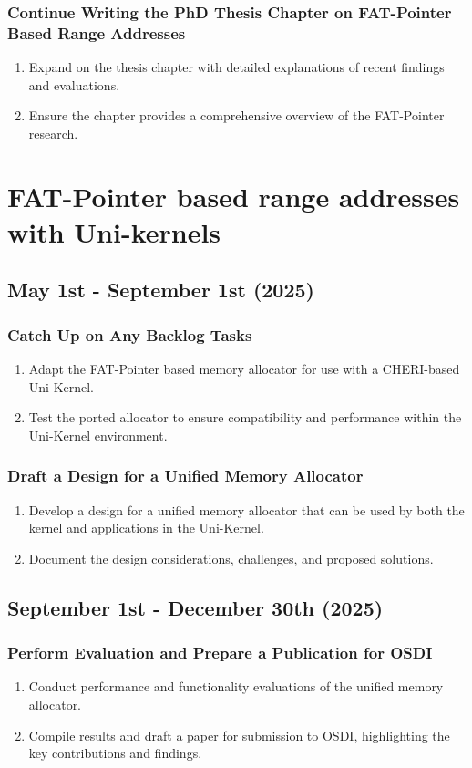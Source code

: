 \subsubsection{Continue Writing the PhD Thesis Chapter on FAT-Pointer Based Range Addresses}
\begin{enumerate}
    \item Expand on the thesis chapter with detailed explanations of recent findings and evaluations.
    \item Ensure the chapter provides a comprehensive overview of the FAT-Pointer research.
\end{enumerate}

\section{FAT-Pointer based range addresses with Uni-kernels}
\subsection{May 1st - September 1st (2025)}
\subsubsection{Catch Up on Any Backlog Tasks}
\begin{enumerate}
    \item Adapt the FAT-Pointer based memory allocator for use with a CHERI-based Uni-Kernel.
    \item Test the ported allocator to ensure compatibility and performance within the Uni-Kernel environment.
\end{enumerate}
\subsubsection{Draft a Design for a Unified Memory Allocator}
\begin{enumerate}
    \item Develop a design for a unified memory allocator that can be used by both the kernel and applications in the Uni-Kernel.
    \item Document the design considerations, challenges, and proposed solutions.
\end{enumerate}
\subsection{September 1st - December 30th (2025)}
\subsubsection{Perform Evaluation and Prepare a Publication for OSDI}
\begin{enumerate}
    \item Conduct performance and functionality evaluations of the unified memory allocator.
    \item Compile results and draft a paper for submission to OSDI, highlighting the key contributions and findings.
\end{enumerate}
